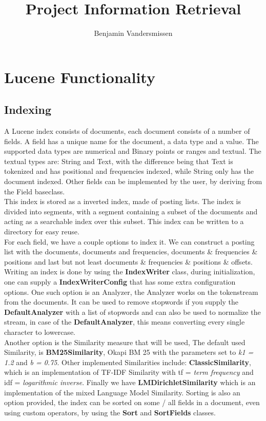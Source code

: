 \documentclass{article}
\begin{document}
\title{Project Information Retrieval}
\author{Benjamin Vandersmissen}
\maketitle
\section{Lucene Functionality}
\subsection{Indexing}
A Lucene index consists of documents, each document consists of a number of fields. A field has a unique name for the document, a data type and a value. The supported data types are numerical and Binary points or ranges and textual. The textual types are: String and Text, with the difference being that Text is tokenized and has positional and frequencies indexed, while String only has the document indexed. Other fields can be implemented by the user, by deriving from the Field baseclass.\\

This index is stored as a inverted index, made of posting lists. The index is divided into segments, with a segment containing a subset of the documents and acting as a searchable index over this subset. This index can be written to a directory for easy reuse.\\

For each field, we have a couple options to index it. We can construct a posting list with the documents, documents and frequencies, documents \& frequencies \& positions and last but not least documents \& frequencies \& positions \& offsets.\\

Writing an index is done by using the \textbf{IndexWriter} class, during initialization, one can supply a \textbf{IndexWriterConfig} that has some extra configuration options. One such option is an Analyzer, the Analyzer works on the tokenstream from the documents. It can be used to remove stopwords if you supply the \textbf{DefaultAnalyzer} with a list of stopwords and can also be used to normalize the stream, in case of the \textbf{DefaultAnalyzer}, this means converting every single character to lowercase. \\

Another option is the Similarity measure that will be used, The default used Similarity, is \textbf{BM25Similarity}, Okapi BM 25 with the parameters set to \textit{k1 = 1.2} and \textit{b = 0.75}. Other implemented Similarities include: \textbf{ClassicSimilarity}, which is an implementation of TF-IDF Similarity with tf = \textit{term frequency} and idf = \textit{logarithmic inverse}. Finally we have \textbf{LMDirichletSimilarity} which is an implementation of the mixed Language Model Similarity. Sorting is also an option provided, the index can be sorted on some / all fields in a document, even using custom operators, by using the \textbf{Sort} and \textbf{SortFields} classes.\\
\end{document}

